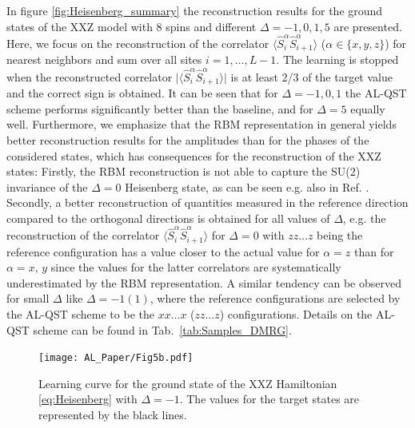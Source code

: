 \documentclass[pra,aps,showpacs,groupedaddress,superscriptaddress,twocolumn,toc=flat,biblatex,footinbib]{revtex4-1}
\begin{document}
In figure \ref{fig:Heisenberg_summary} the reconstruction results for the ground states of the XXZ model with $8$ spins and different $\Delta=-1,0,1,5$ are presented. Here, we focus on the reconstruction of the correlator $\langle \hat{S}_i^\alpha \hat{S}_{i+1}^{\alpha}\rangle$ ($\alpha \in\{x,y,z\}$) for nearest neighbors and sum over all sites $i=1,\dots , L-1$. The learning is stopped when the reconstructed correlator $\vert \langle \hat{S}_i^\alpha \hat{S}_{i+1}^{\alpha}\rangle \vert $ is at least 2/3 of the target value and the correct sign is obtained. It can be seen that for $\Delta=-1,0,1$ the AL-QST scheme performs significantly better than the baseline, and for $\Delta=5$ equally well. Furthermore, we emphasize that the RBM representation in general yields better reconstruction results for the amplitudes than for the phases of the considered states, which has consequences for the reconstruction of the XXZ states: Firstly, the RBM reconstruction is not able to capture the SU(2) invariance of the $\Delta=0$ Heisenberg state, as can be seen e.g. also in Ref. \cite{Torlai2018}. Secondly, a better reconstruction of quantities measured in the reference direction compared to the orthogonal directions is obtained for all values of $\Delta$, e.g. the reconstruction of the correlator $\langle \hat{S}_i^\alpha \hat{S}_{i+1}^{\alpha}\rangle$ for $\Delta=0$ with $zz\dots z$ being the reference configuration has a value closer to the actual value for $\alpha=z$ than for $\alpha=x,\,y$ since the values for the latter correlators are systematically underestimated by the RBM representation. A similar tendency can be observed for small $\Delta$ like $\Delta=-1(1)$, where the reference configurations are selected by the AL-QST scheme to be the $xx\dots x$ ($zz\dots z$) configurations. Details on the AL-QST scheme can be found in Tab.~\ref{tab:Samples_DMRG}.

\begin{figure}[t]
	\centering
   \texttt{[image: AL\_Paper/Fig5b.pdf]}
	\caption[]{Learning curve for the ground state of the XXZ Hamiltonian \eqref{eq:Heisenberg} with $\Delta=-1$. The values for the target states are represented by the black lines.}
	\label{fig:Heisenberg_Delta=-1}
\end{figure}
\end{document}
